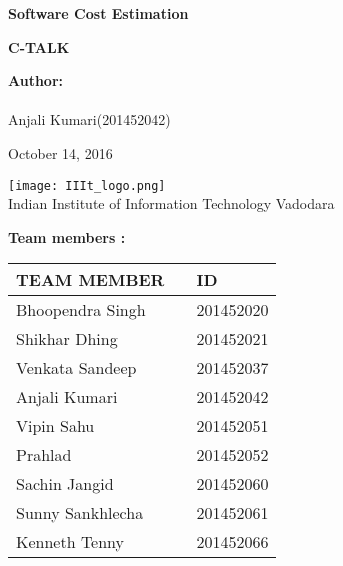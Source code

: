 \documentclass[12pt]{article}
\def\mydate{October 14, 2016}
\begin{document}
	
	\begin{titlepage}
		\begin{center}
			
			
			\LARGE{\textbf{Software Cost Estimation}}
			
			\vspace{1.5cm}
			
			\textbf{C-TALK}\\
			
			\vspace{2cm}
		 
        \large{\textbf{Author:}}\\
			  \large{ \\ Anjali Kumari(201452042)\\}	
			  
			  
			\vspace{1.5cm}
			\mydate{}
			
			
			\vspace{5cm}
			\texttt{[image: IIIt\_logo.png]} \\
			\Large{Indian Institute of Information Technology Vadodara} \\
			
		\end{center}
	\end{titlepage}
	\textbf{Team members :} \\
		\begin{center}
		
		\begin{tabular}{ |m{10em} m{8em} m{9em}|}
			\hline
			TEAM MEMBER          &   & ID        \\
			\hline
			Bhoopendra Singh     &   & 201452020 \\
			Shikhar Dhing        &   & 201452021 \\
			Venkata Sandeep      &   & 201452037 \\
			Anjali Kumari        &   & 201452042 \\
			Vipin Sahu           &   & 201452051 \\
			Prahlad              &   & 201452052 \\ 
			Sachin Jangid        &   & 201452060 \\
			Sunny Sankhlecha     &   & 201452061 \\
			Kenneth Tenny        &   & 201452066 \\
			\hline
		\end{tabular}
		
	\end{center}
	\vspace{2em}
	
\end{document}
